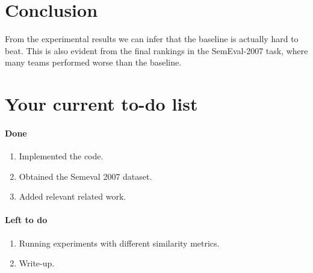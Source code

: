 \documentclass[12pt,letterpaper]{article}
\begin{document}
\section{Conclusion}
From the experimental results we can infer that the baseline is actually hard to beat. This is also evident from the final rankings in the SemEval-2007 task, where many teams performed worse than the baseline. 
\section*{Your current to-do list}
\paragraph{Done}
\begin{enumerate}
\item Implemented the code.
\item Obtained the Semeval 2007 dataset.
\item Added relevant related work.
\end{enumerate}
\paragraph{Left to do}
\begin{enumerate}
\item Running experiments with different similarity metrics.
\item Write-up.
\end{enumerate}



  
\end{document}
